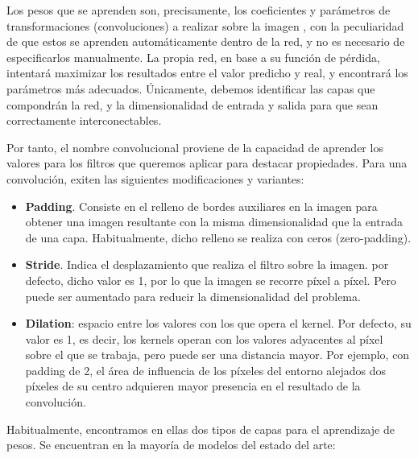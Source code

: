 Los pesos que se aprenden son, precisamente, los coeficientes y parámetros de transformaciones (convoluciones) a realizar sobre la imagen , con la peculiaridad de que estos se aprenden automáticamente dentro de la red, y no es necesario de especificarlos manualmente. La propia red, en base a su función de pérdida, intentará maximizar los resultados entre el valor predicho y real, y encontrará los parámetros más adecuados. Únicamente, debemos identificar las capas que compondrán la red, y la dimensionalidad de entrada y salida para que sean correctamente interconectables.

Por tanto, el nombre convolucional proviene de la capacidad de aprender los valores para los filtros que queremos aplicar para destacar propiedades. Para una convolución, exiten las siguientes modificaciones y variantes:

\begin{itemize}

	\item  \textbf{Padding}. Consiste en el relleno de bordes auxiliares en la imagen para obtener una imagen resultante con la misma dimensionalidad que la entrada de una capa. Habitualmente, dicho relleno se realiza con ceros (zero-padding).
	\item  \textbf{Stride}. Indica el desplazamiento que realiza el filtro sobre la imagen. por defecto, dicho valor es 1, por lo que la imagen se recorre píxel a píxel. Pero puede ser aumentado para reducir la dimensionalidad del problema.
	\item\textbf{Dilation}: espacio entre los valores con los que opera el kernel. Por defecto, su valor es 1, es decir, los kernels operan con los valores adyacentes al píxel sobre el que se trabaja, pero puede ser una distancia mayor. Por ejemplo, con padding de 2, el área de influencia de los píxeles del entorno alejados dos píxeles de su centro adquieren mayor presencia en el resultado de la convolución.

\end{itemize}



Habitualmente, encontramos en ellas dos tipos de capas para el aprendizaje de pesos. Se encuentran en la mayoría de modelos del estado del arte:

